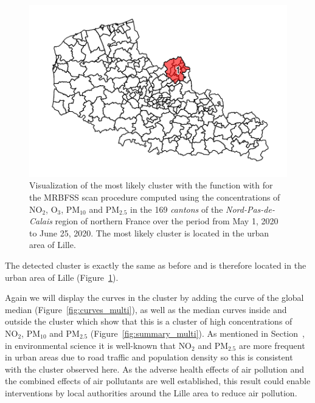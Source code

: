 
\begin{figure}[htbp]
\centering
\includegraphics[width = 0.49\linewidth]{MLC_MRBFSS.pdf}
\caption{Visualization of the most likely cluster with the function  with  for the MRBFSS scan procedure computed using the concentrations of $\text{NO}_2$, $\text{O}_3$, $\text{PM}_{10}$ and $\text{PM}_{2.5}$ in the 169 \textit{cantons} of the \textit{Nord-Pas-de-Calais} region of northern France over the period from May 1, 2020 to June 25, 2020. The most likely cluster is located in the urban area of Lille.}
\label{fig:mlc_mrbfss}
\end{figure}

\noindent The detected cluster is exactly the same as before and is therefore located in the urban area of Lille (Figure~\ref{fig:mlc_mrbfss}).

\noindent Again we will display the curves in the cluster by adding the curve of the global median (Figure~\ref{fig:curves_multi}), as well as the median curves inside and outside the cluster which show that this is a cluster of high concentrations of $_2$, $_{10}$ and $_{2.5}$ (Figure~\ref{fig:summary_multi}). As mentioned in Section~, in environmental science it is well-known that $_2$ and $_{2.5}$ are more frequent in urban areas due to road traffic and population density so this is consistent with the cluster observed here. As the adverse health effects of air pollution and the combined effects of air pollutants are well established, this result could enable interventions by local authorities around the Lille area to reduce air pollution.

